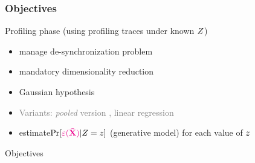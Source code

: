 \begin{frame}
\frametitle{Objectives}

Profiling phase (using profiling traces under known $Z$)
\begin{itemize}
\item {manage de-synchronization problem}
\item {mandatory dimensionality reduction} 
\item {Gaussian hypothesis \cite{Chari2003}}
\item \textcolor{grey}{Variants: \emph{pooled} version \cite{choudary2014efficient}, linear regression \cite{schindler2005stochastic}}
\item estimate{$\mathrm{Pr}[\textcolor{magenta}{\bf \varepsilon(\vec{X})}|Z=z]$ (generative model)} for each value of $z$
\end{itemize}

\begin{block}{Objectives}
\end{block}

\end{frame}


